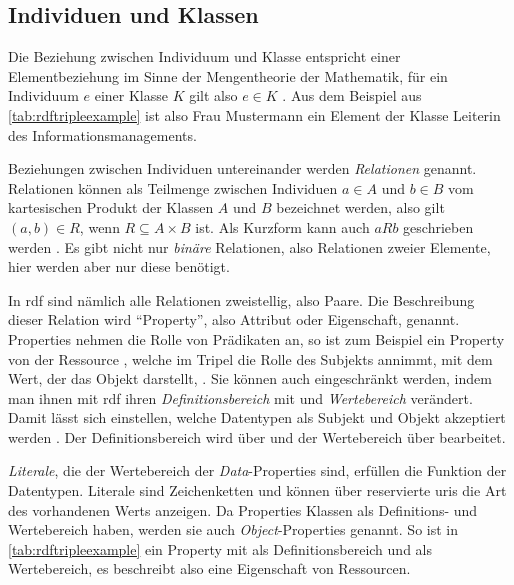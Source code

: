 \subsection{Individuen und Klassen}
\label{sec:individuenundklassen}
Die Beziehung zwischen Individuum und Klasse entspricht einer Elementbeziehung im Sinne der Mengentheorie der Mathematik, für ein Individuum $e$ einer Klasse $K$ gilt also $e \in K$ \citep[S.~261]{semanticwebgrundlagen}.
Aus dem Beispiel aus \cref{tab:rdftripleexample} ist also Frau Mustermann ein Element der Klasse Leiterin des Informationsmanagements.

Beziehungen zwischen Individuen untereinander werden \emph{Relationen} genannt.
Relationen können als Teilmenge zwischen Individuen $a \in A$ und $b \in B$ vom kartesischen Produkt der Klassen $A$ und $B$ bezeichnet werden,
also gilt $(a,b) \in R$, wenn $R \subseteq A \times B$ ist.
Als Kurzform kann auch $aRb$ geschrieben werden \citep[S.~263]{semanticwebgrundlagen}.
Es gibt nicht nur \emph{binäre} Relationen, also Relationen zweier Elemente, hier werden aber nur diese benötigt.

In \ac{rdf} sind nämlich alle Relationen zweistellig, also Paare.
Die Beschreibung dieser Relation wird \enquote{Property}, also Attribut oder Eigenschaft, genannt.
Properties nehmen die Rolle von Prädikaten an, so ist zum Beispiel  ein Property von der Ressource ,
welche im Tripel die Rolle des Subjekts annimmt, mit dem Wert, der das Objekt darstellt, .
Sie können auch eingeschränkt werden, indem man ihnen mit \ac{rdf} ihren \emph{Definitionsbereich} mit und \emph{Wertebereich} verändert.
Damit lässt sich einstellen, welche Datentypen als Subjekt und Objekt akzeptiert werden \citep[S.~76]{semanticwebgrundlagen}.
Der Definitionsbereich wird über  und der Wertebereich über  bearbeitet.

\emph{Literale}, die der Wertebereich der \emph{Data}-Properties sind, erfüllen die Funktion der Datentypen.
Literale sind Zeichenketten und können über reservierte \acp{uri} die Art des vorhandenen Werts anzeigen.
Da Properties Klassen als Definitions- und Wertebereich haben, werden sie auch \emph{Object}-Properties genannt.
So ist in \cref{tab:rdftripleexample}  ein Property mit  als Definitionsbereich und  als Wertebereich,
es beschreibt also eine Eigenschaft von Ressourcen.

